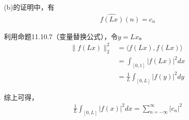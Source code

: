 \documentclass{article}
\begin{document}
\begin{itemize}
        (b)的证明中，有
        \begin{align*}
          \widehat{f(Lx)}(n) = c_n
        \end{align*}

        利用命题11.10.7（变量替换公式），令$y = Lx$。
        \begin{align*}
          \|f(Lx)\|_2^2
           & = \langle f(Lx), f(Lx) \rangle         \\
           & = \int_{[0, 1]} |f(Lx)|^2 dx           \\
           & = \frac{1}{L}\int_{[0, L]} |f(y)|^2 dy
        \end{align*}

        综上可得，
        \begin{align*}
          \frac{1}{L}\int_{[0, L]} |f(x)|^2 dx = \sum\limits_{n = -\infty}^\infty |c_n|^2
        \end{align*}


\end{itemize}
\end{document}
